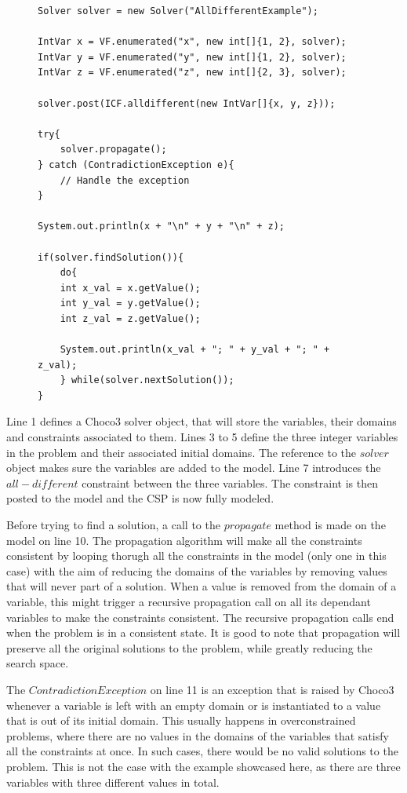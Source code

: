 \documentclass{l4proj}
\begin{document}
\begin{figure}[H]
%
\begin{lstlisting}
Solver solver = new Solver("AllDifferentExample");

IntVar x = VF.enumerated("x", new int[]{1, 2}, solver); 
IntVar y = VF.enumerated("y", new int[]{1, 2}, solver);
IntVar z = VF.enumerated("z", new int[]{2, 3}, solver);

solver.post(ICF.alldifferent(new IntVar[]{x, y, z}));

try{
    solver.propagate();
} catch (ContradictionException e){
    // Handle the exception
}

System.out.println(x + "\n" + y + "\n" + z);

if(solver.findSolution()){
    do{
	int x_val = x.getValue();
	int y_val = y.getValue();
	int z_val = z.getValue();

	System.out.println(x_val + "; " + y_val + "; " + z_val);
    } while(solver.nextSolution());
}
\end{lstlisting}
\label{choco3code}
\end{figure}
 
\noindent Line 1 defines a Choco3 solver object, that will store the variables, their domains and constraints associated to them. Lines 3 to 5 define the three integer variables in the problem and their associated initial domains. The reference to the $solver$ object makes sure the variables are added to the model. Line 7 introduces the $all-different$ constraint between the three variables. The constraint is then posted to the model and the CSP is now fully modeled.

\noindent Before trying to find a solution, a call to the $propagate$ method is made on the model on line 10. The propagation algorithm will make all the constraints consistent by looping thorugh all the constraints in the model (only one in this case) with the aim of reducing the domains of the variables by removing values that will never part of a solution. When a value is removed from the domain of a variable, this might trigger a recursive propagation call on all its dependant variables to make the constraints consistent. The recursive propagation calls end when the problem is in a consistent state. It is good to note that propagation will preserve all the original solutions to the problem, while greatly reducing the search space.

\noindent The $ContradictionException$ on line 11 is an exception that is raised by Choco3 whenever a variable is left with an empty domain or is instantiated to a value that is out of its initial domain. This usually happens in overconstrained problems, where there are no values in the domains of the variables that satisfy all the constraints at once. In such cases, there would be no valid solutions to the problem. This is not the case with the example showcased here, as there are three variables with three different values in total.
\end{document}
